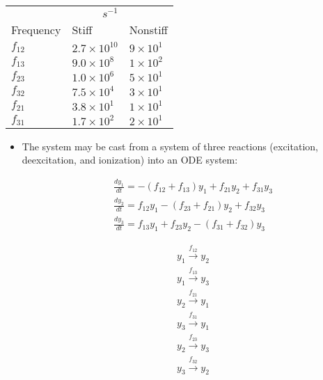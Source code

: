 	
\begin{frame}[fragile]
	\frametitle{\insertsubsectionhead}
	\begin{center}
	\begin{scriptsize}
	\begin{tabular}{lll}
	\hline
	\multicolumn{2}{r}{$s^{-1}$} \\
	\cline{2-3}
	Frequency  & Stiff & Nonstiff \\
	\hline
	$f_{12}$ & $2.7 \times 10^{10}$ & $9 \times 10^{1}$ \\
	$f_{13}$ & $9.0 \times 10^8$ & $1 \times 10^{2}$ \\
	$f_{23}$ & $1.0 \times 10^6$ & $5 \times 10^{1}$ \\
	$f_{32}$ & $7.5 \times 10^{4}$ & $3 \times 10^{1}$ \\
	$f_{21}$ & $3.8 \times 10^{1}$ & $1 \times 10^{1}$ \\
	$f_{31}$ & $1.7 \times 10^{2}$ & $2 \times 10^{1}$ \\
	\hline
	\end{tabular}
	\end{scriptsize}
	\end{center}
	\begin{itemize}
		\item The system may be cast from a system of three reactions (excitation, deexcitation, and ionization) into an ODE system:
		\begin{scriptsize}
		\begin{minipage}{0.5\linewidth}
		\begin{align*}
			&\frac{dy_1}{dt} = -(f_{12} + f_{13})y_1 + f_{21}y_2 + f_{31}y_3 \\
			&\frac{dy_2}{dt} = f_{12}y_1 - (f_{23} + f_{21})y_2 + f_{32}y_3 \\
			&\frac{dy_3}{dt} = f_{13}y_1 + f_{23}y_2 - (f_{31} + f_{32})y_3
		\end{align*}
		\end{minipage}%
		\begin{minipage}{0.5\linewidth}
		\begin{align*}
			&y_1 \xrightarrow{f_{12}} y_2 \\
			&y_1 \xrightarrow{f_{13}} y_3 \\
			&y_2 \xrightarrow{f_{21}} y_1 \\
			&y_3 \xrightarrow{f_{31}} y_1 \\
			&y_2 \xrightarrow{f_{23}} y_3 \\
			&y_3 \xrightarrow{f_{32}} y_2 
		\end{align*}
		\end{minipage}
		\end{scriptsize}
	\end{itemize}
\end{frame}

